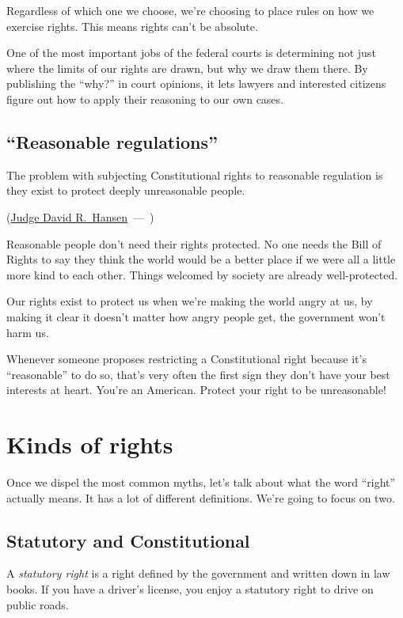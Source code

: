 \documentclass[10pt]{article}
\let\oldquote\quote
\let\endoldquote\endquote
\renewenvironment{quote}[2][]
  {\if\relax\detokenize{#1}\relax
     \def\quoteauthor{#2}%
   \else
     \def\quoteauthor{#2~---~#1}%
   \fi
   \oldquote}
  {\par\nobreak\smallskip\hfill(\quoteauthor)%
   \endoldquote\addvspace{\bigskipamount}}
\begin{document}
Regardless of which one we choose, we're choosing to place rules on how we exercise rights.  This means rights can't be absolute.

One of the most important jobs of the federal courts is determining not just where the limits of our rights are drawn, but why we draw them there.  By publishing the ``why?'' in court opinions, it lets lawyers and interested citizens figure out how to apply their reasoning to our own cases.

\subsection{``Reasonable regulations''}

\begin{quote}{\href{https://en.wikipedia.org/wiki/David_R._Hansen}{Judge David R.~Hansen}}
The problem with subjecting Constitutional rights to reasonable regulation is they exist to protect deeply unreasonable people.
\end{quote}

Reasonable people don't need their rights protected.  No one needs the Bill of Rights to say they think the world would be a better place if we were all a little more kind to each other.  Things welcomed by society are already well-protected.

Our rights exist to protect us when we're making the world angry at us, by making it clear it doesn't matter how angry people get, the government won't harm us.

Whenever someone proposes restricting a Constitutional right because it's ``reasonable'' to do so, that's very often the first sign they don't have your best interests at heart.  You're an American.  Protect your right to be unreasonable!

\section{Kinds of rights}

Once we dispel the most common myths, let's talk about what the word ``right'' actually means.  It has a lot of different definitions.  We're going to focus on two.

\subsection{Statutory and Constitutional}
A {\it statutory right} is a right defined by the government and written down in law books.  If you have a driver's license, you enjoy a statutory right to drive on public roads. 
\end{document}
